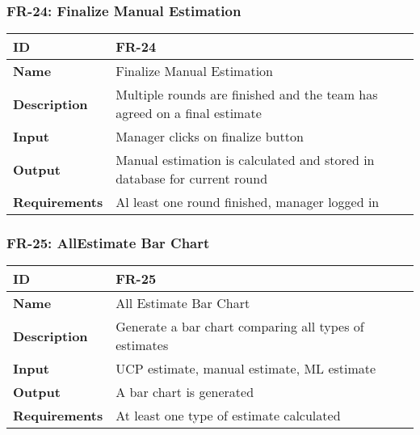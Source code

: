 \subsubsection{FR-24: Finalize Manual Estimation}
\begin{center}
  \begin{tabularx}{\textwidth}{|l|X|}
      \hline
      \textbf{ID} & FR-24 \\
      \hline
      \textbf{Name} & Finalize Manual Estimation \\
      \hline
      \textbf{Description} & Multiple rounds are finished and the team has agreed on a final estimate \\
      \hline
      \textbf{Input} & Manager clicks on finalize button \\
      \hline
      \textbf{Output} & Manual estimation is calculated and stored in database for current round \\
      \hline
      \textbf{Requirements} & Al least one round finished, manager logged in \\
      \hline
  \end{tabularx}
\end{center}

\subsubsection{FR-25: AllEstimate Bar Chart}
\begin{center}
  \begin{tabularx}{\textwidth}{|l|X|}
      \hline
      \textbf{ID} & FR-25 \\
      \hline
      \textbf{Name} & All Estimate Bar Chart \\
      \hline
      \textbf{Description} & Generate a bar chart comparing all types of estimates \\
      \hline
      \textbf{Input} & UCP estimate, manual estimate, ML estimate \\
      \hline
      \textbf{Output} & A bar chart is generated \\
      \hline
      \textbf{Requirements} & At least one type of estimate calculated \\
      \hline
  \end{tabularx}
\end{center}

